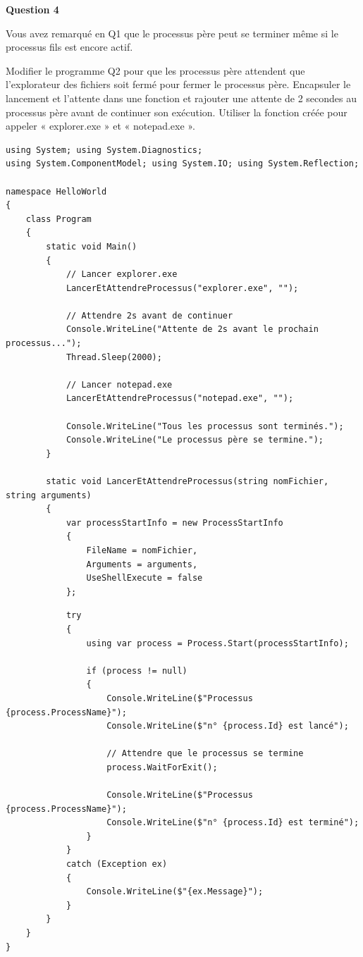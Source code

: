 \newpage 

\noindent \textbf{Question 4}

\noindent Vous avez remarqué en Q1 que le processus père peut se terminer même si le processus fils est encore actif.

\noindent Modifier le programme Q2 pour que les processus père attendent que l'explorateur des fichiers soit fermé pour fermer le processus père. Encapsuler le lancement et l'attente dans une fonction et rajouter une attente de 2 secondes au processus père avant de continuer son exécution. Utiliser la fonction créée pour appeler « explorer.exe » et « notepad.exe ».

\begin{verbatim}
using System; using System.Diagnostics;
using System.ComponentModel; using System.IO; using System.Reflection;

namespace HelloWorld
{
    class Program
    {
        static void Main()
        {
            // Lancer explorer.exe
            LancerEtAttendreProcessus("explorer.exe", "");

            // Attendre 2s avant de continuer
            Console.WriteLine("Attente de 2s avant le prochain processus...");
            Thread.Sleep(2000);

            // Lancer notepad.exe
            LancerEtAttendreProcessus("notepad.exe", "");

            Console.WriteLine("Tous les processus sont terminés.");
			Console.WriteLine("Le processus père se termine.");
        }

        static void LancerEtAttendreProcessus(string nomFichier, string arguments)
        {
            var processStartInfo = new ProcessStartInfo
            {
                FileName = nomFichier,
                Arguments = arguments,
                UseShellExecute = false
            };
\end{verbatim}

\newpage

\begin{verbatim}
            try
            {
                using var process = Process.Start(processStartInfo);

                if (process != null)
                {
                    Console.WriteLine($"Processus {process.ProcessName}");
					Console.WriteLine($"n° {process.Id} est lancé");

                    // Attendre que le processus se termine
                    process.WaitForExit();

                    Console.WriteLine($"Processus {process.ProcessName}");
					Console.WriteLine($"n° {process.Id} est terminé");
                }
            }
            catch (Exception ex)
            {
                Console.WriteLine($"{ex.Message}");
            }
        }
    }
}
\end{verbatim}

